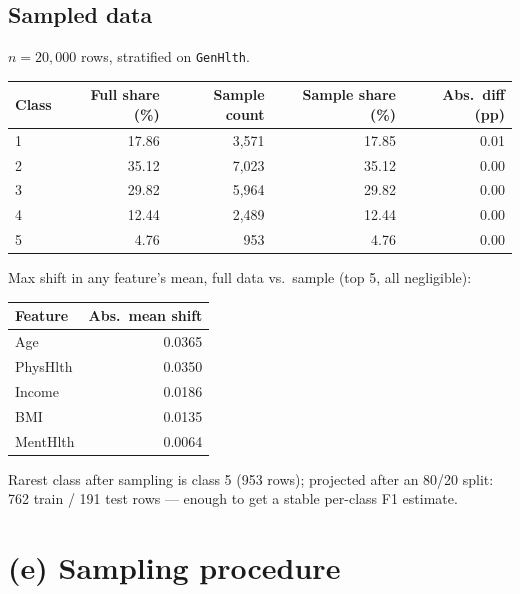 \documentclass[11pt]{article}
\newcommand{\code}[1]{\texttt{#1}}
\begin{document}
\subsection*{Sampled data}
$n = 20{,}000$ rows, stratified on \code{GenHlth}.

\begin{center}
\begin{tabular}{lrrrr}
\toprule
Class & Full share (\%) & Sample count & Sample share (\%) & Abs.\ diff (pp) \\
\midrule
1 & 17.86 & 3,571 & 17.85 & 0.01 \\
2 & 35.12 & 7,023 & 35.12 & 0.00 \\
3 & 29.82 & 5,964 & 29.82 & 0.00 \\
4 & 12.44 & 2,489 & 12.44 & 0.00 \\
5 & 4.76  & 953   & 4.76  & 0.00 \\
\bottomrule
\end{tabular}
\end{center}

Max shift in any feature's mean, full data vs.\ sample (top 5, all negligible):

\begin{center}
\begin{tabular}{lr}
\toprule
Feature & Abs.\ mean shift \\
\midrule
Age & 0.0365 \\
PhysHlth & 0.0350 \\
Income & 0.0186 \\
BMI & 0.0135 \\
MentHlth & 0.0064 \\
\bottomrule
\end{tabular}
\end{center}

Rarest class after sampling is class 5 (953 rows); projected after an 80/20 split: 762 train / 191 test rows --- enough to get a stable per-class F1 estimate.

\section*{(e) Sampling procedure}
\end{document}
